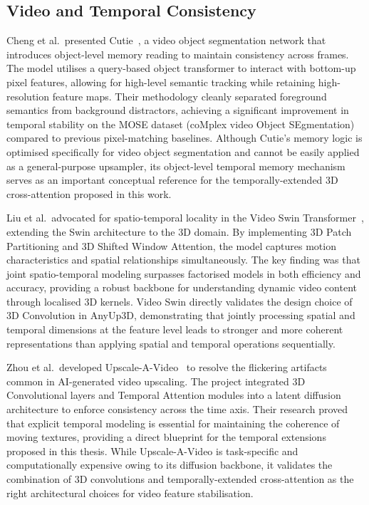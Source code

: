 \subsection{Video and Temporal Consistency}

Cheng et al.\ presented Cutie~\cite{cutie}, a video
object segmentation network that introduces object-level memory
reading to maintain consistency across frames.
The model utilises a query-based object transformer to
interact with bottom-up pixel features, allowing for
high-level semantic tracking while retaining high-resolution
feature maps.
Their methodology cleanly separated foreground semantics from
background distractors, achieving a significant improvement in
temporal stability on the MOSE dataset (coMplex video Object SEgmentation) compared to previous
pixel-matching baselines.
Although Cutie's memory logic is optimised specifically for
video object segmentation and cannot be easily applied as a
general-purpose upsampler, its object-level temporal memory
mechanism serves as an important conceptual reference for the
temporally-extended 3D cross-attention proposed in this work.

Liu et al.\ advocated for spatio-temporal locality in
the Video Swin Transformer~\cite{swin}, extending the Swin
architecture to the 3D domain.
By implementing 3D Patch Partitioning and 3D Shifted Window
Attention, the model captures motion characteristics and
spatial relationships simultaneously.
The key finding was that joint spatio-temporal modeling
surpasses factorised models in both efficiency and accuracy,
providing a robust backbone for understanding dynamic video
content through localised 3D kernels.
Video Swin directly validates the design choice of 3D
Convolution in AnyUp3D, demonstrating that jointly
processing spatial and temporal dimensions at the feature
level leads to stronger and more coherent representations
than applying spatial and temporal operations sequentially.

Zhou et al.\ developed Upscale-A-Video~\cite{upscale_video}
to resolve the flickering artifacts common in AI-generated
video upscaling.
The project integrated 3D Convolutional layers and Temporal
Attention modules into a latent diffusion architecture to
enforce consistency across the time axis.
Their research proved that explicit temporal modeling is
essential for maintaining the coherence of moving textures,
providing a direct blueprint for the temporal extensions
proposed in this thesis.
While Upscale-A-Video is task-specific and computationally
expensive owing to its diffusion backbone, it validates the
combination of 3D convolutions and temporally-extended
cross-attention as the right architectural choices for video
feature stabilisation.

